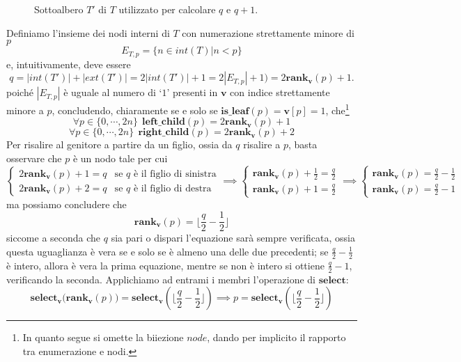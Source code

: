 \begin{figure}[h]
	\caption{Sottoalbero $T'$ di $T$ utilizzato per calcolare $q$ e $q+1$.}
	\label{fig:btree_rappr_step}
\end{figure}

Definiamo l'insieme dei nodi interni di $T$ con numerazione strettamente
minore di $p$
$$
	E_{T, p} = \{n \in int(T) | n < p \}
$$
e, intuitivamente, deve essere
$$
	q = |int(T')| + |ext(T')| = 2 |int(T')| + 1 = 2 |E_{T,p}| + 1 ) = 2 \mathbf{rank_v}(p) + 1.
$$
poiché $|E_{T,p}|$ è uguale al numero di `$1$' presenti in $\mathbf{v}$ con indice
strettamente minore a $p$, concludendo, chiaramente se e solo se
$\mathbf{is\_leaf}(p) = \mathbf{v}[p] = 1$, che\footnote{In quanto segue si omette
	la biiezione $node$, dando per implicito il rapporto tra enumerazione e nodi.}
$$
	\forall p \in \{0, \cdots, 2n\} ~~ \mathbf{left\_child}(p) = 2 \mathbf{rank_v}(p) + 1
$$
$$
	\forall p \in \{0, \cdots, 2n\} ~~ \mathbf{right\_child}(p) = 2 \mathbf{rank_v}(p) + 2
$$
Per risalire al genitore a partire da un figlio, ossia da $q$ risalire a $p$,
basta osservare che $p$ è un nodo tale per cui
$$
	\begin{cases}
		2\mathbf{rank_v}(p) + 1 = q & \text{se } q \text{ è il figlio di sinistra} \\
		2\mathbf{rank_v}(p) + 2 = q & \text{se } q \text{ è il figlio di destra}
	\end{cases}
	\implies
	\begin{cases}
		\mathbf{rank_v}(p) + \frac{1}{2} = \frac{q}{2} \\
		\mathbf{rank_v}(p) + 1 = \frac{q}{2}
	\end{cases}
	\implies
	\begin{cases}
		\mathbf{rank_v}(p) = \frac{q}{2}  - \frac{1}{2} \\
		\mathbf{rank_v}(p) = \frac{q}{2} - 1
	\end{cases}
$$
ma possiamo concludere che
$$
	\mathbf{rank_v}(p) = \lfloor \frac{q}{2} - \frac{1}{2} \rfloor
$$
siccome a seconda che $q$ sia pari o dispari l'equazione sarà sempre verificata,
ossia questa uguaglianza è vera se e solo se è almeno una delle due precedenti;
se $\frac{q}{2} - \frac{1}{2}$ è intero, allora è vera la prima equazione, mentre
se non è intero si ottiene $\frac{q}{2} - 1$, verificando la seconda.
Applichiamo ad entrami i membri l'operazione di $\mathbf{select}$:
$$
	\mathbf{select_v(rank_v}(p)) = \mathbf{select_v}(\lfloor \frac{q}{2} - \frac{1}{2} \rfloor)
	\implies p = \mathbf{select_v}(\lfloor \frac{q}{2} - \frac{1}{2} \rfloor)
$$

